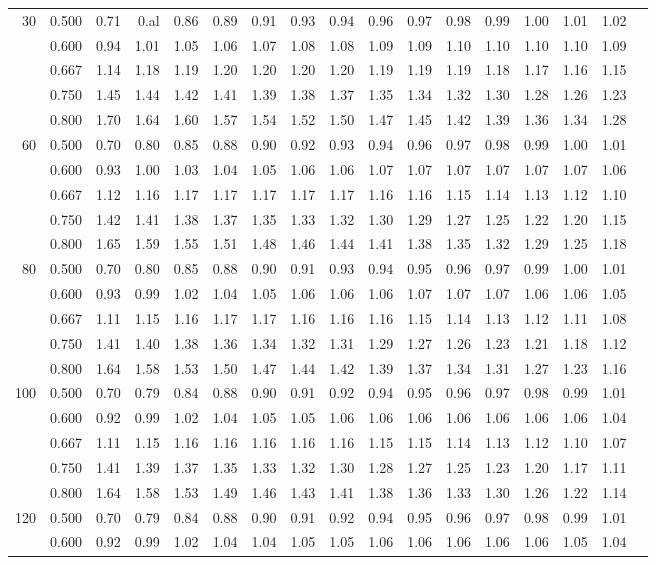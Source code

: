 \documentclass[pdftex,11pt,openany]{book}\usepackage[]{graphicx}\usepackage[]{color}
\begin{document}
{\begin{center}
\begin{tabular}{rrr@{\,}r@{\,}r@{\,}r@{\,}r@{\,}r@{\,}r@{\,}r
                   @{\,}r@{\,}r@{\,}r@{\,}r@{\,}r@{\,}r@{\,}r}
30&0.500&0.71&0.al&0.86&0.89&0.91&0.93&0.94&0.96&0.97&0.98&0.99&1.00&1.01&1.02\\
  &0.600&0.94&1.01&1.05&1.06&1.07&1.08&1.08&1.09&1.09&1.10&1.10&1.10&1.10&1.09\\
  &0.667&1.14&1.18&1.19&1.20&1.20&1.20&1.20&1.19&1.19&1.19&1.18&1.17&1.16&1.15\\
  &0.750&1.45&1.44&1.42&1.41&1.39&1.38&1.37&1.35&1.34&1.32&1.30&1.28&1.26&1.23\\
  &0.800&1.70&1.64&1.60&1.57&1.54&1.52&1.50&1.47&1.45&1.42&1.39&1.36&1.34&1.28\\
60&0.500&0.70&0.80&0.85&0.88&0.90&0.92&0.93&0.94&0.96&0.97&0.98&0.99&1.00&1.01\\
  &0.600&0.93&1.00&1.03&1.04&1.05&1.06&1.06&1.07&1.07&1.07&1.07&1.07&1.07&1.06\\
  &0.667&1.12&1.16&1.17&1.17&1.17&1.17&1.17&1.16&1.16&1.15&1.14&1.13&1.12&1.10\\
  &0.750&1.42&1.41&1.38&1.37&1.35&1.33&1.32&1.30&1.29&1.27&1.25&1.22&1.20&1.15\\
  &0.800&1.65&1.59&1.55&1.51&1.48&1.46&1.44&1.41&1.38&1.35&1.32&1.29&1.25&1.18\\
  80&0.500&0.70&0.80&0.85&0.88&0.90&0.91&0.93&0.94&0.95&0.96&0.97&0.99&1.00&1.01\\
  &0.600&0.93&0.99&1.02&1.04&1.05&1.06&1.06&1.06&1.07&1.07&1.07&1.06&1.06&1.05\\
  &0.667&1.11&1.15&1.16&1.17&1.17&1.16&1.16&1.16&1.15&1.14&1.13&1.12&1.11&1.08\\
  &0.750&1.41&1.40&1.38&1.36&1.34&1.32&1.31&1.29&1.27&1.26&1.23&1.21&1.18&1.12\\
  &0.800&1.64&1.58&1.53&1.50&1.47&1.44&1.42&1.39&1.37&1.34&1.31&1.27&1.23&1.16\\
100
  &0.500&0.70&0.79&0.84&0.88&0.90&0.91&0.92&0.94&0.95&0.96&0.97&0.98&0.99&1.01\\
  &0.600&0.92&0.99&1.02&1.04&1.05&1.05&1.06&1.06&1.06&1.06&1.06&1.06&1.06&1.04\\
  &0.667&1.11&1.15&1.16&1.16&1.16&1.16&1.16&1.15&1.15&1.14&1.13&1.12&1.10&1.07\\
  &0.750&1.41&1.39&1.37&1.35&1.33&1.32&1.30&1.28&1.27&1.25&1.23&1.20&1.17&1.11\\
  &0.800&1.64&1.58&1.53&1.49&1.46&1.43&1.41&1.38&1.36&1.33&1.30&1.26&1.22&1.14\\
120
  &0.500&0.70&0.79&0.84&0.88&0.90&0.91&0.92&0.94&0.95&0.96&0.97&0.98&0.99&1.01\\
  &0.600&0.92&0.99&1.02&1.04&1.04&1.05&1.05&1.06&1.06&1.06&1.06&1.06&1.05&1.04\\

\end{tabular}
\end{center}}
\end{document}
